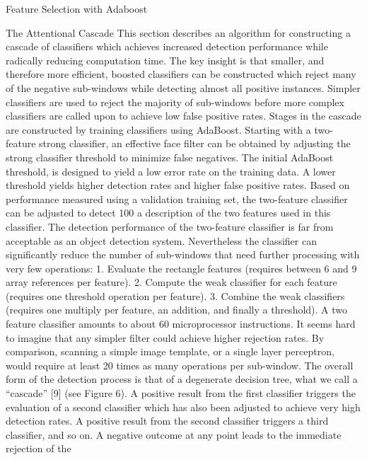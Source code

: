 \begin{compactitem}
\item {Feature Selection with Adaboost}
\item {The Attentional Cascade}
This section describes an algorithm for constructing a cascade of classifiers which
achieves increased detection performance while radically reducing computation time.
The key insight is that smaller, and therefore more efficient, boosted classifiers can be
constructed which reject many of the negative sub-windows while detecting almost all
positive instances. Simpler classifiers are used to reject the majority of sub-windows
before more complex classifiers are called upon to achieve low false positive rates.
Stages in the cascade are constructed by training classifiers using AdaBoost. Starting
with a two-feature strong classifier, an effective face filter can be obtained by adjusting
the strong classifier threshold to minimize false negatives. The initial AdaBoost
threshold,
is designed to yield a low error rate on the training data. A lower
threshold yields higher detection rates and higher false positive rates. Based on performance
measured using a validation training set, the two-feature classifier can be
adjusted to detect 100%
a description of the two features used in this classifier.
The detection performance of the two-feature classifier is far from acceptable as an
object detection system. Nevertheless the classifier can significantly reduce the number
of sub-windows that need further processing with very few operations:
1. Evaluate the rectangle features (requires between 6 and 9 array references per
feature).
2. Compute the weak classifier for each feature (requires one threshold operation
per feature).
3. Combine the weak classifiers (requires one multiply per feature, an addition, and
finally a threshold).
A two feature classifier amounts to about 60 microprocessor instructions. It seems
hard to imagine that any simpler filter could achieve higher rejection rates. By comparison,
scanning a simple image template, or a single layer perceptron, would require at
least 20 times as many operations per sub-window.
The overall form of the detection process is that of a degenerate decision tree, what
we call a “cascade” [9] (see Figure 6). A positive result from the first classifier triggers
the evaluation of a second classifier which has also been adjusted to achieve very high
detection rates. A positive result from the second classifier triggers a third classifier,
and so on. A negative outcome at any point leads to the immediate rejection of the

\end{compactitem}
